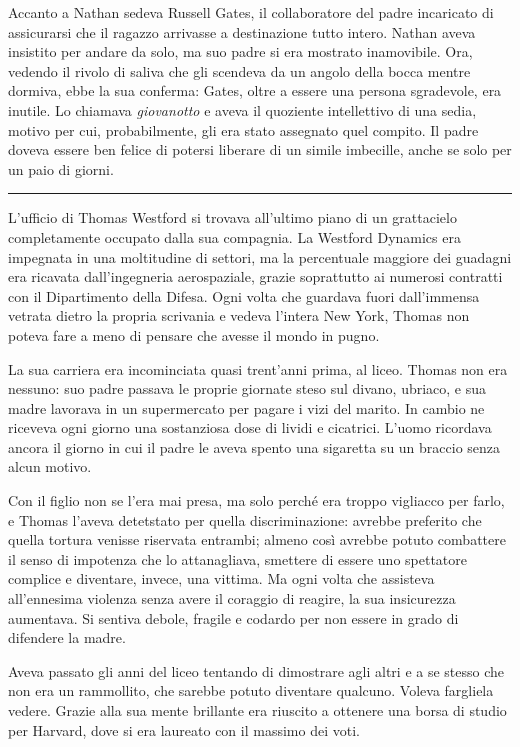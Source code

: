 \documentclass[a4paper,oneside,11pt]{memoir}
\begin{document}
Accanto a Nathan sedeva Russell Gates, il collaboratore del padre incaricato di assicurarsi che il ragazzo arrivasse a
destinazione tutto intero. Nathan aveva insistito per andare da solo, ma suo padre si era mostrato inamovibile. Ora,
vedendo il rivolo di saliva che gli scendeva da un angolo della bocca mentre dormiva, ebbe la sua conferma: Gates, oltre
a essere una persona sgradevole, era inutile. Lo chiamava \emph{giovanotto} e aveva il quoziente intellettivo di una
sedia, motivo per cui, probabilmente, gli era stato assegnato quel compito. Il padre doveva essere ben felice di potersi
liberare di un simile imbecille, anche se solo per un paio di giorni.

\plainbreak{1}

L'ufficio di Thomas Westford si trovava all'ultimo piano di un grattacielo completamente occupato dalla sua compagnia.
La Westford Dynamics era impegnata in una moltitudine di settori, ma la percentuale maggiore dei guadagni era ricavata
dall'ingegneria aerospaziale, grazie soprattutto ai numerosi contratti con il Dipartimento della Difesa. Ogni volta che
guardava fuori dall'immensa vetrata dietro la propria scrivania e vedeva l'intera New York, Thomas non poteva fare a
meno di pensare che avesse il mondo in pugno.

La sua carriera era incominciata quasi trent'anni prima, al liceo. Thomas non era nessuno: suo padre passava le proprie
giornate steso sul divano, ubriaco, e sua madre lavorava in un supermercato per pagare i vizi del marito. In cambio ne
riceveva ogni giorno una sostanziosa dose di lividi e cicatrici. L'uomo ricordava ancora il giorno in cui il padre le
aveva spento una sigaretta su un braccio senza alcun motivo.

Con il figlio non se l'era mai presa, ma solo perché era troppo vigliacco per farlo, e Thomas l'aveva detetstato per
quella discriminazione: avrebbe preferito che quella tortura venisse riservata entrambi; almeno così avrebbe potuto
combattere il senso di impotenza che lo attanagliava, smettere di essere uno spettatore complice e diventare, invece,
una vittima. Ma ogni volta che assisteva all'ennesima violenza senza avere il coraggio di reagire, la sua insicurezza
aumentava. Si sentiva debole, fragile e codardo per non essere in grado di difendere la madre.

Aveva passato gli anni del liceo tentando di dimostrare agli altri e a se stesso che non era un rammollito, che sarebbe
potuto diventare qualcuno. Voleva fargliela vedere. Grazie alla sua mente brillante era riuscito a ottenere una borsa di
studio per Harvard, dove si era laureato con il massimo dei voti.
\end{document}
